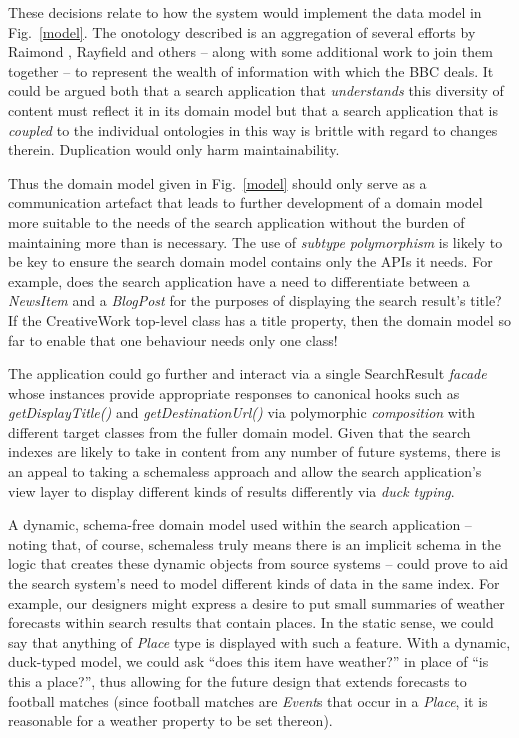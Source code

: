 \documentclass[oribibl]{llncs}
\begin{document}
These decisions relate to how the system would implement the data model
in Fig.~\ref{model}. The onotology described is an aggregation
of several efforts by Raimond \citep{raimond2009bbc}, Rayfield
\citep{rayfield2011bbc} and others -- along with some additional work
to join them together -- to represent the wealth of
information with which the BBC deals. It could be argued both that
a search application that \emph{understands} this diversity of
content must reflect it in its domain model but that a search
application that is \emph{coupled} to the individual ontologies
in this way is brittle with regard to changes therein. Duplication
would only harm maintainability.

Thus the domain model given in Fig.~\ref{model} should only serve
as a communication artefact that leads to further development of
a domain model more suitable to the needs of the search application
without the burden of maintaining more than is necessary. The use
of \emph{subtype polymorphism} \citep{booch2007object} is likely
to be key to ensure the search domain model contains only the APIs
it needs. For example, does the search application have a need
to differentiate between a \emph{NewsItem} and a \emph{BlogPost}
for the purposes of displaying the search result's title? If the
CreativeWork top-level class has a title property, then the domain
model so far to enable that one behaviour needs only one class!

The application could go further and interact via a single
SearchResult \emph{facade} \citep{fowler2002patterns} whose
instances provide appropriate responses to canonical hooks
such as \emph{getDisplayTitle()} and \emph{getDestinationUrl()}
via polymorphic \emph{composition} with different target classes
from the fuller domain model. Given that the search indexes
are likely to take in content from any number of future systems,
there is an appeal to taking a schemaless approach \citep{sadalage2012nosql}
and allow the search application's view layer to display
different kinds of results differently via \emph{duck typing}.
\citep{python2013ducktyping}

A dynamic, schema-free domain model used within the search application
-- noting that, of course, schemaless truly means there is an
implicit schema in the logic that creates these dynamic objects from
source systems \citep{sadalage2012nosql} -- could prove to aid the
search system's need to model different kinds of data in the same
index. For example, our designers might express a desire to put
small summaries of weather forecasts within search results that
contain places. In the static sense, we could say that anything
of \emph{Place} type is displayed with such a feature. With
a dynamic, duck-typed model, we could ask
``does this item have weather?'' in place of ``is this a place?'', thus
allowing for the future design that extends forecasts to football
matches (since football matches are \emph{Event}s that occur in
a \emph{Place}, it is reasonable for a weather property to be
set thereon).
\end{document}
